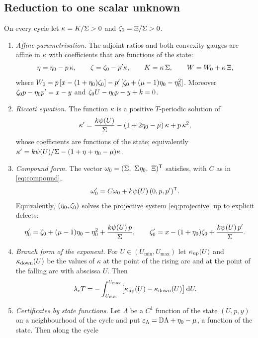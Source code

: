 \subsection{Reduction to one scalar unknown}
\begin{proposition}\label{prop:kappa}
On every cycle let $\kappa=K/\Sigma>0$ and $\zeta_0=\Xi/\Sigma>0$.
\begin{enumerate}[label=(\roman*)]
\item \emph{Affine parametrisation.} The adjoint ratios and both convexity gauges are affine in $\kappa$ with coefficients that are functions of the state:
\begin{equation}\label{gau:affine}
\eta=\eta_0-p\,\kappa,\qquad \zeta=\zeta_0-p'\kappa,\qquad K=\kappa\,\Sigma,\qquad W=W_0+\kappa\,\Xi,
\end{equation}
where $W_0=p\,[x-(1+\eta_0)\zeta_0]-p'\,[\zeta_0+(\mu-1)\eta_0-\eta_0^2]$. Moreover $\zeta_0p-\eta_0 p'=x-y$ and $\zeta_0U-\eta_0 p-y+k=0$.
\item \emph{Riccati equation.} The function $\kappa$ is a positive $T$-periodic solution of
\begin{equation}\label{eq:kappariccati}
\kappa'=\frac{k\psi(U)}{\Sigma}-(1+2\eta_0-\mu)\,\kappa+p\,\kappa^2 ,
\end{equation}
whose coefficients are functions of the state; equivalently $\kappa'=k\psi(U)/\Sigma-(1+\eta+\eta_0-\mu)\kappa$.
\item \emph{Compound form.} The vector $\omega_0=(\Sigma,\ \Sigma\eta_0,\ \Xi)^{\mathsf T}$ satisfies, with $C$ as in \eqref{eq:compound},
\begin{equation}\label{gau:compoundsource}
\omega_0'=C\omega_0+k\psi(U)\,(0,p,p')^{\mathsf T}.
\end{equation}
Equivalently, $(\eta_0,\zeta_0)$ solves the projective system \eqref{eq:projective} up to explicit defects:
\[
\eta_0'=\zeta_0+(\mu-1)\eta_0-\eta_0^2+\frac{k\psi(U)\,p}{\Sigma},\qquad
\zeta_0'=x-(1+\eta_0)\zeta_0+\frac{k\psi(U)\,p'}{\Sigma}.
\]
\item \emph{Branch form of the exponent.} For $U\in(U_{\min},U_{\max})$ let $\kappa_{\rm up}(U)$ and $\kappa_{\rm down}(U)$ be the values of $\kappa$ at the point of the rising arc and at the point of the falling arc with abscissa $U$. Then
\begin{equation}\label{gau:branch}
\lambda_cT=-\int_{U_{\min}}^{U_{\max}}\bigl[\kappa_{\rm up}(U)-\kappa_{\rm down}(U)\bigr]\,\mathrm dU .
\end{equation}
\item \emph{Certificates by state functions.} Let $\Lambda$ be a $C^1$ function of the state $(U,p,y)$ on a neighbourhood of the cycle and put $\varepsilon_\Lambda=\mathbb D\Lambda+\eta_0-\mu$, a function of the state. Then along the cycle

\end{enumerate}
\end{proposition}

